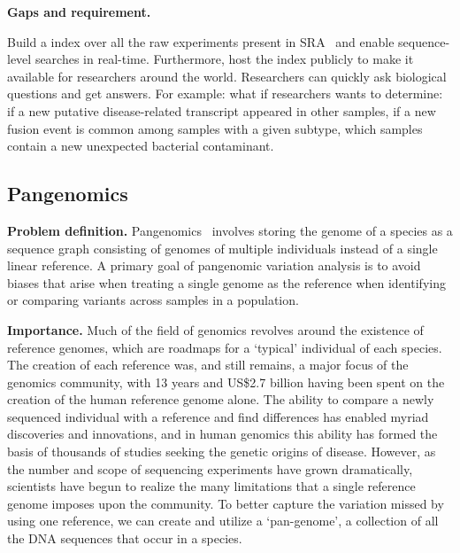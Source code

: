 \noindent
{\bf Gaps and requirement.}


\begin{rproblem}
Build a \kmer index over all the raw experiments present in SRA~\cite{kodama2012sequence} and enable sequence-level searches in real-time. Furthermore, host the index publicly to make it available for researchers around the world. Researchers can quickly ask biological questions and get answers. For example: what if researchers wants to determine: if a new putative disease-related transcript appeared in other samples, if a new fusion event is
common among samples with a given subtype, which samples contain a new unexpected bacterial contaminant. 
\label{rprob:peppermint2}
\end{rproblem}

\subsection{Pangenomics}

{\bf Problem definition.}
Pangenomics~\cite{garrison2018variation} involves storing the genome of a species as a sequence graph consisting of genomes of multiple individuals instead of a single linear reference. A primary goal of pangenomic variation analysis is to avoid biases that arise when treating a single genome as the reference when identifying or comparing variants across samples in a population.

\noindent
{\bf Importance.}
Much of the field of genomics revolves around the existence of reference genomes, which are roadmaps for a ‘typical’ individual of each species. The creation of each reference was, and still remains, a major focus of the genomics community, with 13 years and US\$2.7 billion having been spent on the creation of the human reference genome alone. The ability to compare a newly sequenced individual with a reference and find differences has enabled myriad discoveries and innovations, and in human genomics this ability has formed the basis of thousands of studies seeking the genetic origins of disease. However, as the number and scope of sequencing experiments have grown dramatically, scientists have begun to realize the many limitations that a single reference genome imposes upon the community. To better capture the variation missed by using one reference, we can create and utilize a ‘pan-genome’, a collection of all the DNA sequences that occur in a species.

